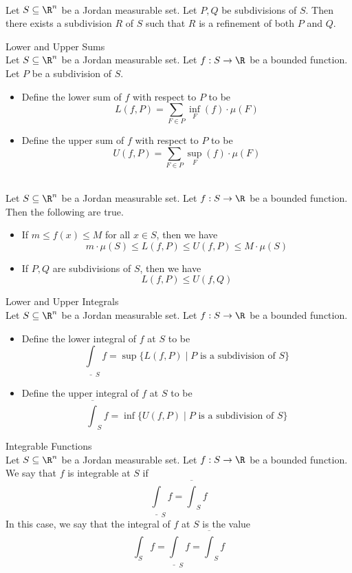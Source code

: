 \documentclass[a4paper]{article}
\begin{document}
\begin{prp}{}{}\\
Let $S\subseteq\R^n$ be a Jordan measurable set. Let $P,Q$ be subdivisions of $S$. Then there exists a subdivision $R$ of $S$ such that $R$ is a refinement of both $P$ and $Q$. 
\end{prp}

\begin{defn}{Lower and Upper Sums}{}\\
Let $S\subseteq\R^n$ be a Jordan measurable set. Let $f:S\to\R$ be a bounded function. Let $P$ be a subdivision of $S$. 
\begin{itemize}
\item Define the lower sum of $f$ with respect to $P$ to be $$L(f,P)=\sum_{F\in P}\inf_F(f)\cdot \mu(F)$$
\item Define the upper sum of $f$ with respect to $P$ to be $$U(f,P)=\sum_{F\in P}\sup_F(f)\cdot \mu(F)$$
\end{itemize}
\end{defn}

\begin{prp}{}{}\\
Let $S\subseteq\R^n$ be a Jordan measurable set. Let $f:S\to\R$ be a bounded function. Then the following are true. 
\begin{itemize}
\item If $m\leq f(x)\leq M$ for all $x\in S$, then we have $$m\cdot\mu(S)\leq L(f,P)\leq U(f,P)\leq M\cdot\mu(S)$$
\item If $P,Q$ are subdivisions of $S$, then we have $$L(f,P)\leq U(f,Q)$$
\end{itemize}
\end{prp}

\begin{defn}{Lower and Upper Integrals}{}\\
Let $S\subseteq\R^n$ be a Jordan measurable set. Let $f:S\to\R$ be a bounded function. 
\begin{itemize}
\item Define the lower integral of $f$ at $S$ to be $$\underline{\int}_Sf=\sup\{L(f,P)\;|\;P\text{ is a subdivision of }S\}$$
\item Define the upper integral of $f$ at $S$ to be $$\overline{\int}_Sf=\inf\{U(f,P)\;|\;P\text{ is a subdivision of }S\}$$
\end{itemize}
\end{defn}

\begin{defn}{Integrable Functions}{}\\
Let $S\subseteq\R^n$ be a Jordan measurable set. Let $f:S\to\R$ be a bounded function. We say that $f$ is integrable at $S$ if $$\underline{\int}_Sf=\overline{\int}_Sf$$ In this case, we say that the integral of $f$ at $S$ is the value $$\int_Sf=\underline{\int}_Sf=\overline{\int}_Sf$$
\end{defn}
\end{document}
